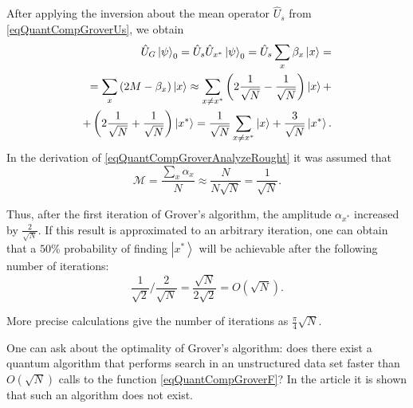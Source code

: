 After applying the inversion about the mean operator $\hat{U}_s$ 
from \eqref{eqQuantCompGroverUs}, we obtain
\begin{eqnarray}
\hat{U}_G \left|\psi\right>_0 = 
\hat{U}_s \hat{U}_{x^{\ast}} \left|\psi\right>_0 = 
\hat{U}_s \sum_x \beta_x \ket{x} = 
\nonumber \\
= \sum_x \left(2 M - \beta_x\right) \ket{x} \approx 
\sum_{x\ne x^{\ast}} \left( 2 \frac{1}{\sqrt{N}} - \frac{1}{\sqrt{N}}
\right) \ket{x} + 
\nonumber \\
+ \left( 2 \frac{1}{\sqrt{N}} +
\frac{1}{\sqrt{N}} \right) \left|x^{\ast}\right> = 
\frac{1}{\sqrt{N}}\sum_{x\ne x^{\ast}} \ket{x} + 
\frac{3}{\sqrt{N}} \left|x^{\ast}\right>.
\label{eqQuantCompGroverAnalyzeRought}
\end{eqnarray}
In the derivation of \eqref{eqQuantCompGroverAnalyzeRought} it was assumed that
\[
\mathcal{M} = \frac{\sum_x \alpha_x}{N} \approx
\frac{N}{N \sqrt{N}} = \frac{1}{\sqrt{N}}.
\]

Thus, after the first iteration of Grover's algorithm, the amplitude
$\alpha_{x^{\ast}}$ increased by $\frac{2}{\sqrt{N}}$. If
this result is approximated to an arbitrary iteration, one can
obtain that a $50\%$ probability of finding $\left|x^{\ast}\right>$
will be achievable after the following number of iterations:
\[
\frac{1}{\sqrt{2}}/\frac{2}{\sqrt{N}} =
\frac{\sqrt{N}}{2 \sqrt{2}} = O\left(\sqrt{N}\right).
\]

More precise calculations \cite{nielsen2000quantum} give the number of iterations as $\frac{\pi}{4}\sqrt{N}$. 

One can ask about the optimality of Grover's algorithm: does there exist
a quantum algorithm that performs search in an unstructured data set faster than $O\left(\sqrt{N}\right)$ calls to
the function \eqref{eqQuantCompGroverF}? In the article
\cite{bBennettGroverOptimal} it is shown that such an algorithm
does not exist.
